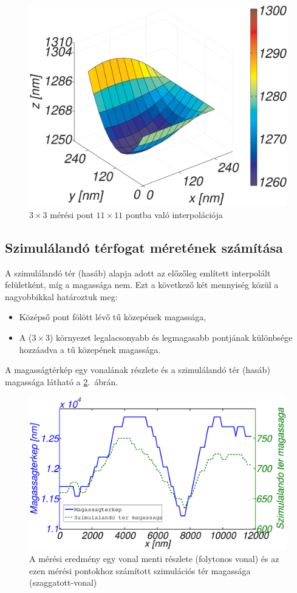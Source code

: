 	\begin{figure}[!h]
		\centering
		\includegraphics[width=0.8\columnwidth]{figures/eps/3x3_interpol2.eps}
		\caption{$3\times3$ mérési pont $11\times11$ pontba való interpolációja}
		\label{fig:33pont}
	\end{figure}
	
\subsection{Szimulálandó térfogat méretének számítása}
	A szimulálandó tér (hasáb) alapja adott az előzőleg említett interpolált felületként, míg a
	magassága nem. Ezt a következő két mennyiség közül a nagyobbikkal határoztuk meg:
	\begin{itemize}
		\item Középső pont fölött lévő tű közepének magassága,
		\item A ($3\times3$) környezet legalacsonyabb és legmagasabb pontjának
		különbsége hozzáadva a tű közepének magassága.
	\end{itemize}
	A magasságtérkép egy vonalának részlete és a szimulálandó tér (hasáb) magassága látható a \ref{fig:numh}.~ábrán.
	
	\begin{figure}[!ht]
		\centering
		\includegraphics[width=0.7\columnwidth]{figures/eps/numh_vonal.eps}%
		\caption{A mérési eredmény egy vonal menti részlete (folytonos vonal) és az ezen
		mérési pontokhoz számított szimulációs tér magassága (szaggatott-vonal)}
		\label{fig:numh} 
	\end{figure}

